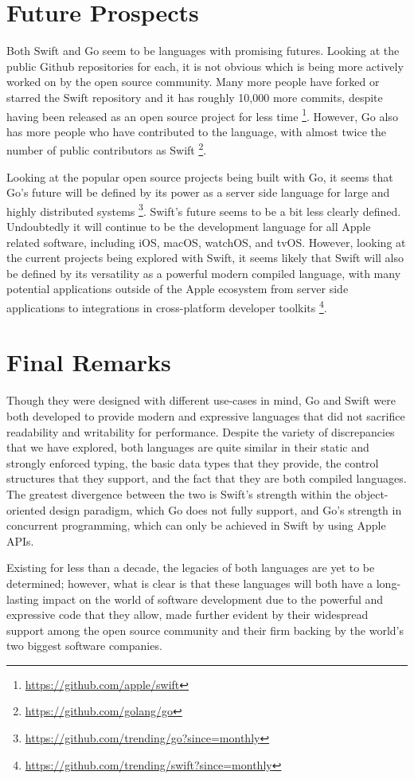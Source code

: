\documentclass[letterpaper]{article}
\begin{document}
\section{Future Prospects}

Both Swift and Go seem to be languages with promising futures. Looking at the public Github repositories for each, it is not obvious which is being more actively worked on by the open source community. Many more people have forked or starred the Swift repository and it has roughly 10,000 more commits, despite having been released as an open source project for less time \footnote{\url{https://github.com/apple/swift}}. However, Go also has more people who have contributed to the language, with almost twice the number of public contributors as Swift \footnote{\url{https://github.com/golang/go}}.

Looking at the popular open source projects being built with Go, it seems that Go’s future will be defined by its power as a server side language for large and highly distributed systems \footnote{\url{https://github.com/trending/go?since=monthly}}. Swift’s future seems to be a bit less clearly defined. Undoubtedly it will continue to be the development language for all Apple related software, including iOS, macOS, watchOS, and tvOS. However, looking at the current projects being explored with Swift, it seems likely that Swift will also be defined by its versatility as a powerful modern compiled language, with many potential applications outside of the Apple ecosystem from server side applications to integrations in cross-platform developer toolkits \footnote{\url{https://github.com/trending/swift?since=monthly}}.

\section{Final Remarks}

Though they were designed with different use-cases in mind, Go and Swift were both developed to provide modern and expressive languages that did not sacrifice readability and writability for performance. Despite the variety of discrepancies that we have explored, both languages are quite similar in their static and strongly enforced typing, the basic data types that they provide, the control structures that they support, and the fact that they are both compiled languages. The greatest divergence between the two is Swift's strength within the object-oriented design paradigm, which Go does not fully support, and Go's strength in concurrent programming, which can only be achieved in Swift by using Apple APIs.

Existing for less than a decade, the legacies of both languages are yet to be determined; however, what is clear is that these languages will both have a long-lasting impact on the world of software development due to the powerful and expressive code that they allow, made further evident by their widespread support among the open source community and their firm backing by the world's two biggest software companies.
\end{document}
